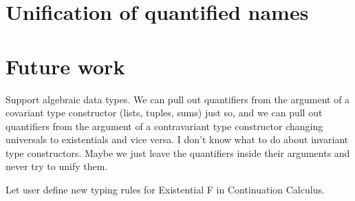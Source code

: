 \documentclass{amsart}
\begin{document}
\section{Unification of quantified names}
\label{sec:unify}

\section{Future work}

Support algebraic data types. We can pull out quantifiers from
the argument of a covariant type constructor (lists, tuples,
sums) just so, and we can pull out quantifiers from the argument
of a contravariant type constructor changing universals to
existentials and vice versa. I don't know what to do about
invariant type constructors. Maybe we just leave the quantifiers
inside their arguments and never try to unify them.

Let user define new typing rules for Existential F in
Continuation Calculus.
\end{document}
